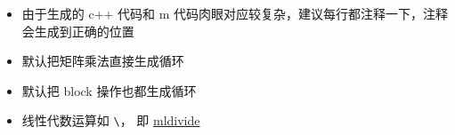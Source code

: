 \begin{itemize}
\begin{lstlisting}[language=matlab]
% 解线性方程组
% A = rand(30,30);
A = rand(30,30);
% ret=ret+ sprintf('sum(A) = %0.5e\n', sum(A(:)));
ret=ret+ sprintf('sum(A) = %0.5e\n', sum(A(:)));
% X = rand(30,100);
X = rand(30,100);
% ret=ret+ sprintf('sum(X) = %0.5e\n', sum(X(:)));
ret=ret+ sprintf('sum(X) = %0.5e\n', sum(X(:)));
% B = A * X;
B = A * X;
% ret=ret+ sprintf('sum(B) = %0.5e\n', sum(B(:)));
ret=ret+ sprintf('sum(B) = %0.5e\n', sum(B(:)));
% X1 = A \ B;
X1 = A \ B;
% ret=ret+ sprintf('sum(X1) = %0.5e\n', sum(X1(:)));
ret=ret+ sprintf('sum(X1) = %0.5e\n', sum(X1(:)));
% if norm(X-X1) > 1e-10
if norm(X-X1) > 1e-10
    % ret=ret+ sprintf('error: norm(X-X1) = %0.5e\n', norm(X-X1));
    ret=ret+ sprintf('error: norm(X-X1) = %0.5e\n', norm(X-X1));
end

% 本征问题
% A = A + A.';
A = A + A.';
% ret=ret+ sprintf('sum(A) = %0.5e\n', sum(A(:)));
ret=ret+ sprintf('sum(A) = %0.5e\n', sum(A(:)));
% [V, D] = eig(A);
[V, D] = eig(A);
% err = max(max(abs(A*V - V*D)));
err = max(max(abs(A*V - V*D)));
% if err > 1e-10
if err > 1e-10
    % ret=ret+ sprintf('error: err = %0.5e\n', err);
    ret=ret+ sprintf('error: err = %0.5e\n', err);
end
end

\end{lstlisting}
\item 由于生成的 c++ 代码和 m 代码肉眼对应较复杂，建议每行都注释一下，注释会生成到正确的位置
\item 默认把矩阵乘法直接生成循环
\item 默认把 block 操作也都生成循环
\item 线性代数运算如 \verb`\`， 即 \href{https://www.mathworks.com/help/releases/R2024b/matlab/ref/double.mldivide.html}{mldivide}
\end{itemize}
